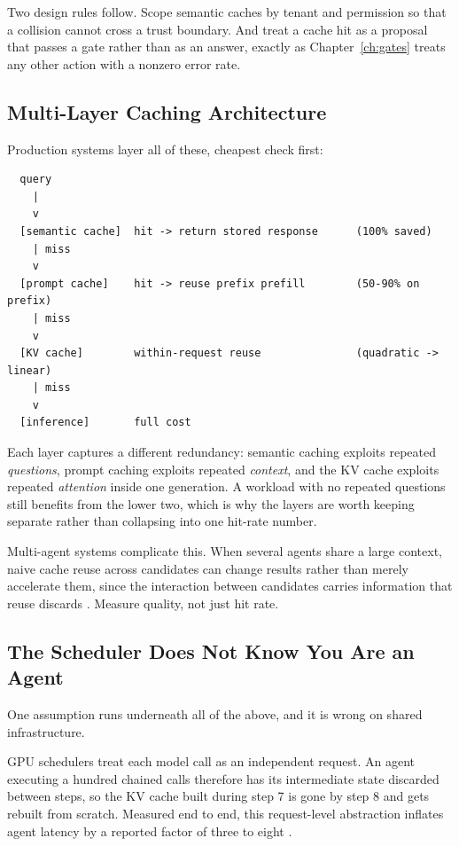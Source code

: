 Two design rules follow. Scope semantic caches by tenant and permission so that a
collision cannot cross a trust boundary. And treat a cache hit as a proposal that
passes a gate rather than as an answer, exactly as Chapter~\ref{ch:gates} treats
any other action with a nonzero error rate.

\subsection{Multi-Layer Caching Architecture}

Production systems layer all of these, cheapest check first:

{\footnotesize{\footnotesize
\begin{verbatim}
  query
    |
    v
  [semantic cache]  hit -> return stored response      (100% saved)
    | miss
    v
  [prompt cache]    hit -> reuse prefix prefill        (50-90% on prefix)
    | miss
    v
  [KV cache]        within-request reuse               (quadratic -> linear)
    | miss
    v
  [inference]       full cost
\end{verbatim}
}}

Each layer captures a different redundancy: semantic caching exploits repeated
\emph{questions}, prompt caching exploits repeated \emph{context}, and the KV
cache exploits repeated \emph{attention} inside one generation. A workload with
no repeated questions still benefits from the lower two, which is why the layers
are worth keeping separate rather than collapsing into one hit-rate number.

Multi-agent systems complicate this. When several agents share a large context,
naive cache reuse across candidates can change results rather than merely
accelerate them, since the interaction between candidates carries information
that reuse discards \cite{kvreuse2026}. Measure quality, not just hit rate.

\subsection{The Scheduler Does Not Know You Are an Agent}

One assumption runs underneath all of the above, and it is wrong on shared
infrastructure.

GPU schedulers treat each model call as an independent request. An agent
executing a hundred chained calls therefore has its intermediate state discarded
between steps, so the KV cache built during step 7 is gone by step 8 and gets
rebuilt from scratch. Measured end to end, this request-level abstraction
inflates agent latency by a reported factor of three to eight
\cite{saga2026}.

